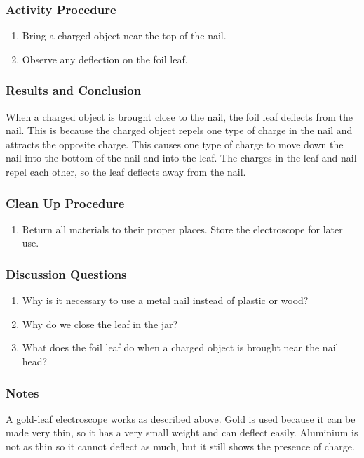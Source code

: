 \subsubsection*{Activity Procedure}
\begin{enumerate}
\item{Bring a charged object near the top of the nail.} 
\item{Observe any deflection on the foil leaf.} 
\end{enumerate}

\subsubsection*{Results and Conclusion}
When a charged object is brought close to the nail, the foil leaf deflects from the nail. This is because the charged object repels one type of charge in the nail and attracts the opposite charge. This causes one type of charge to move down the nail into the bottom of the nail and into the leaf. The charges in the leaf and nail repel each other, so the leaf deflects away from the nail. 

\subsubsection*{Clean Up Procedure}
\begin{enumerate}
\item{Return all materials to their proper places. Store the electroscope for later use.} 
\end{enumerate}

\subsubsection*{Discussion Questions}
\begin{enumerate}
\item{Why is it necessary to use a metal nail instead of plastic or wood?}
\item{Why do we close the leaf in the jar?}
\item{What does the foil leaf do when a charged object is brought near the nail head?}
\end{enumerate}

\subsubsection*{Notes}
A gold-leaf electroscope works as described above. Gold is used because it can be made very thin, so it has a very small weight and can deflect easily. Aluminium is not as thin so it cannot deflect as much, but it still shows the presence of charge. 

